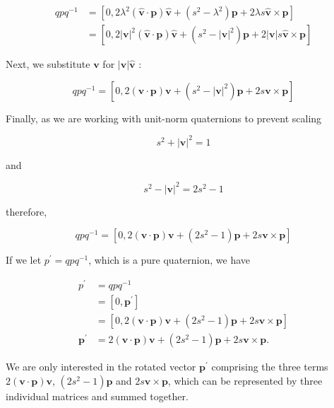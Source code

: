 $$
\begin{aligned}
q p q^{-1} & =\left[0,2 \lambda^{2}(\hat{\mathbf{v}} \cdot \mathbf{p}) \hat{\mathbf{v}}+\left(s^{2}-\lambda^{2}\right) \mathbf{p}+2 \lambda s \hat{\mathbf{v}} \times \mathbf{p}\right] \\
& =\left[0,2|\mathbf{v}|^{2}(\hat{\mathbf{v}} \cdot \mathbf{p}) \hat{\mathbf{v}}+\left(s^{2}-|\mathbf{v}|^{2}\right) \mathbf{p}+2|\mathbf{v}| s \hat{\mathbf{v}} \times \mathbf{p}\right]
\end{aligned}
$$

Next, we substitute $\mathbf{v}$ for $|\mathbf{v}| \hat{\mathbf{v}}$ :

$$
q p q^{-1}=\left[0,2(\mathbf{v} \cdot \mathbf{p}) \mathbf{v}+\left(s^{2}-|\mathbf{v}|^{2}\right) \mathbf{p}+2 s \mathbf{v} \times \mathbf{p}\right]
$$

Finally, as we are working with unit-norm quaternions to prevent scaling

$$
s^{2}+|\mathbf{v}|^{2}=1
$$

and

$$
s^{2}-|\mathbf{v}|^{2}=2 s^{2}-1
$$

therefore,

$$
q p q^{-1}=\left[0,2(\mathbf{v} \cdot \mathbf{p}) \mathbf{v}+\left(2 s^{2}-1\right) \mathbf{p}+2 s \mathbf{v} \times \mathbf{p}\right]
$$

If we let $p^{\prime}=q p q^{-1}$, which is a pure quaternion, we have

$$
\begin{aligned}
p^{\prime} & =q p q^{-1} \\
& =\left[0, \mathbf{p}^{\prime}\right] \\
& =\left[0,2(\mathbf{v} \cdot \mathbf{p}) \mathbf{v}+\left(2 s^{2}-1\right) \mathbf{p}+2 s \mathbf{v} \times \mathbf{p}\right] \\
\mathbf{p}^{\prime} & =2(\mathbf{v} \cdot \mathbf{p}) \mathbf{v}+\left(2 s^{2}-1\right) \mathbf{p}+2 s \mathbf{v} \times \mathbf{p} .
\end{aligned}
$$

We are only interested in the rotated vector $\mathbf{p}^{\prime}$ comprising the three terms $2(\mathbf{v} \cdot \mathbf{p}) \mathbf{v}$, $\left(2 s^{2}-1\right) \mathbf{p}$ and $2 s \mathbf{v} \times \mathbf{p}$, which can be represented by three individual matrices and summed together.

